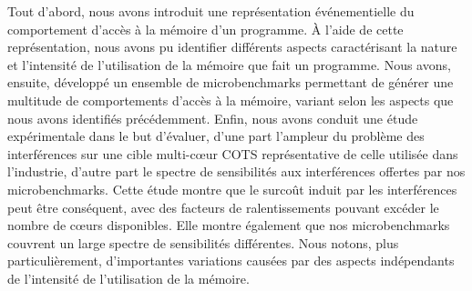 Tout d'abord, nous avons introduit une représentation événementielle du comportement d'accès à la mémoire d'un programme. 
À l'aide de cette représentation, nous avons pu identifier différents aspects caractérisant la nature et l'intensité de l'utilisation de la mémoire que fait un programme.
Nous avons, ensuite, développé un ensemble de microbenchmarks permettant de générer une multitude de comportements d'accès à la mémoire, variant selon les aspects que nous avons identifiés précédemment.
Enfin, nous avons conduit une étude expérimentale dans le but d'évaluer, d'une part l'ampleur du problème des interférences sur une cible multi-cœur COTS représentative de celle utilisée dans l'industrie, d'autre part le spectre de sensibilités aux interférences offertes par nos microbenchmarks.
Cette étude montre que le surcoût induit par les interférences peut être conséquent, avec des facteurs de ralentissements pouvant excéder le nombre de cœurs disponibles.
Elle montre également que nos microbenchmarks couvrent un large spectre de sensibilités différentes.
Nous notons, plus particulièrement, d'importantes variations causées par des aspects indépendants de l'intensité de l'utilisation de la mémoire.


